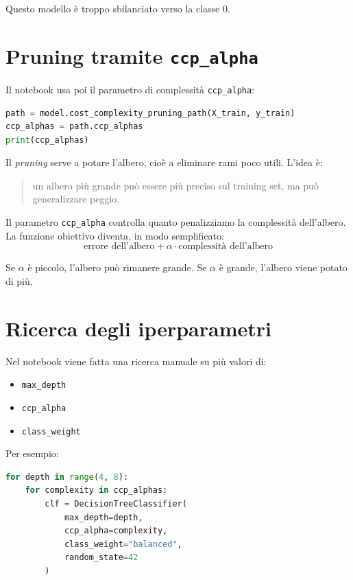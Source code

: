 \documentclass[11pt,a4paper]{article}
\begin{document}
Questo modello è troppo sbilanciato verso la classe 0.

\section{Pruning tramite \texttt{ccp\_alpha}}
Il notebook usa poi il parametro di complessità \texttt{ccp\_alpha}:

\begin{lstlisting}[language=Python]
path = model.cost_complexity_pruning_path(X_train, y_train)
ccp_alphas = path.ccp_alphas
print(ccp_alphas)
\end{lstlisting}

Il \textit{pruning} serve a potare l'albero, cioè a eliminare rami poco utili. L'idea è:
\begin{quote}
    un albero più grande può essere più preciso sul training set, ma può generalizzare peggio.
\end{quote}

Il parametro \texttt{ccp\_alpha} controlla quanto penalizziamo la complessità dell'albero. La funzione obiettivo diventa, in modo semplificato:
\begin{equation}
    \text{errore dell'albero} + \alpha \cdot \text{complessità dell'albero}
\end{equation}

Se $\alpha$ è piccolo, l'albero può rimanere grande. Se $\alpha$ è grande, l'albero viene potato di più.

\section{Ricerca degli iperparametri}
Nel notebook viene fatta una ricerca manuale su più valori di:
\begin{itemize}
    \item \texttt{max\_depth}
    \item \texttt{ccp\_alpha}
    \item \texttt{class\_weight}
\end{itemize}

Per esempio:

\begin{lstlisting}[language=Python]
for depth in range(4, 8):
    for complexity in ccp_alphas:
        clf = DecisionTreeClassifier(
            max_depth=depth,
            ccp_alpha=complexity,
            class_weight="balanced",
            random_state=42
        )
\end{lstlisting}
\end{document}
